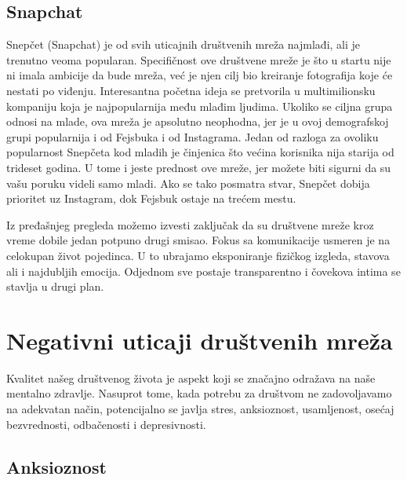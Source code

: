 \documentclass[a4paper]{article}
\begin{document}
{		\subsection{Snapchat}
		\label{subsec:podnaslov4}
		Snepčet (Snapchat) je od svih uticajnih društvenih mreža najmlađi, ali je trenutno veoma popularan. Specifičnost ove društvene mreže je što u startu nije ni imala ambicije da bude mreža, već je njen cilj bio kreiranje fotografija koje će nestati po viđenju. Interesantna početna ideja se pretvorila u multimilionsku kompaniju koja je najpopularnija među mlađim ljudima. Ukoliko se ciljna grupa odnosi na mlade, ova mreža je apsolutno neophodna, jer je u ovoj demografskoj grupi popularnija i od Fejsbuka i od Instagrama. Jedan od razloga za ovoliku popularnost Snepčeta kod mladih je činjenica što većina korisnika nija starija od trideset godina. U tome i jeste prednost ove mreže, jer možete biti sigurni da su vašu poruku videli samo mladi. Ako se tako posmatra stvar, Snepčet dobija prioritet uz Instagram, dok Fejsbuk ostaje na trećem mestu.
		
	    \hspace{0.5mm} Iz pređašnjeg pregleda možemo izvesti zaključak da su društvene mreže kroz vreme dobile jedan potpuno drugi smisao. Fokus sa komunikacije usmeren je na celokupan život pojedinca. U to ubrajamo eksponiranje fizičkog izgleda, stavova ali i najdubljih emocija. Odjednom sve postaje transparentno i čovekova intima se stavlja u drugi plan.
		
		
		\section{Negativni uticaji društvenih mreža}	
		\label{sec:termini_i_citiranje}
		Kvalitet našeg društvenog života je aspekt koji se značajno odražava na naše mentalno zdravlje. Nasuprot tome, kada potrebu za društvom ne zadovoljavamo na adekvatan način, potencijalno se javlja stres, anksioznost, usamljenost, osećaj bezvrednosti, odbačenosti i depresivnosti.
		\subsection{Anksioznost}
		\label{subsec:podnaslov4}
		
}
\end{document}
